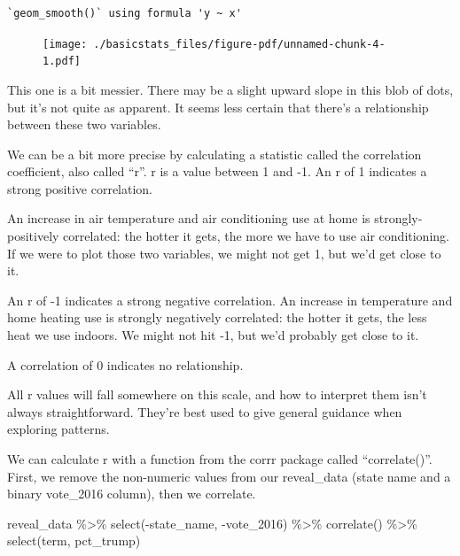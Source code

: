 \documentclass[
  letterpaper,
  DIV=11,
  numbers=noendperiod]{scrreprt}
\newenvironment{Shaded}{\begin{snugshade}}{\end{snugshade}}
\newcommand{\FunctionTok}[1]{\textcolor[rgb]{0.28,0.35,0.67}{#1}}
\newcommand{\NormalTok}[1]{\textcolor[rgb]{0.00,0.23,0.31}{#1}}
\newcommand{\SpecialCharTok}[1]{\textcolor[rgb]{0.37,0.37,0.37}{#1}}
\begin{document}
\begin{verbatim}
`geom_smooth()` using formula 'y ~ x'
\end{verbatim}

\begin{figure}[H]

{\centering \texttt{[image: ./basicstats\_files/figure-pdf/unnamed-chunk-4-1.pdf]}

}

\end{figure}

This one is a bit messier. There may be a slight upward slope in this
blob of dots, but it's not quite as apparent. It seems less certain that
there's a relationship between these two variables.

We can be a bit more precise by calculating a statistic called the
correlation coefficient, also called ``r''. r is a value between 1 and
-1. An r of 1 indicates a strong positive correlation.

An increase in air temperature and air conditioning use at home is
strongly-positively correlated: the hotter it gets, the more we have to
use air conditioning. If we were to plot those two variables, we might
not get 1, but we'd get close to it.

An r of -1 indicates a strong negative correlation. An increase in
temperature and home heating use is strongly negatively correlated: the
hotter it gets, the less heat we use indoors. We might not hit -1, but
we'd probably get close to it.

A correlation of 0 indicates no relationship.

All r values will fall somewhere on this scale, and how to interpret
them isn't always straightforward. They're best used to give general
guidance when exploring patterns.

We can calculate r with a function from the corrr package called
``correlate()''. First, we remove the non-numeric values from our
reveal\_data (state name and a binary vote\_2016 column), then we
correlate.

\begin{Shaded}
\begin{Highlighting}[]
\NormalTok{reveal\_data }\SpecialCharTok{\%\textgreater{}\%}
  \FunctionTok{select}\NormalTok{(}\SpecialCharTok{{-}}\NormalTok{state\_name, }\SpecialCharTok{{-}}\NormalTok{vote\_2016) }\SpecialCharTok{\%\textgreater{}\%}
  \FunctionTok{correlate}\NormalTok{() }\SpecialCharTok{\%\textgreater{}\%}
  \FunctionTok{select}\NormalTok{(term, pct\_trump)}
\end{Highlighting}
\end{Shaded}
\end{document}
